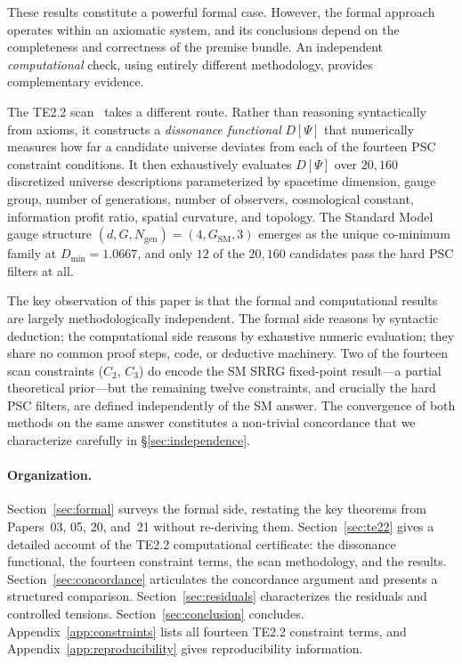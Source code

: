 \documentclass[11pt,twocolumn]{article}
\theoremstyle{remark}
\begin{document}
These results constitute a powerful formal case.
However, the formal approach operates within an axiomatic system, and
its conclusions depend on the completeness and correctness of the
premise bundle.
An independent \emph{computational} check, using entirely different
methodology, provides complementary evidence.

The TE2.2 scan~\cite{SpivackPSCConcordance} takes a different route.
Rather than reasoning syntactically from axioms, it constructs a
\emph{dissonance functional} $D[\Psi]$ that numerically measures
how far a candidate universe deviates from each of the fourteen PSC
constraint conditions.
It then exhaustively evaluates $D[\Psi]$ over $20{,}160$ discretized
universe descriptions parameterized by spacetime dimension, gauge
group, number of generations, number of observers, cosmological
constant, information profit ratio, spatial curvature, and topology.
The Standard Model gauge structure $(d,G,N_{\mathrm{gen}})=(4,G_{\mathrm{SM}},3)$
emerges as the unique co-minimum family at $D_{\min}=1.0667$,
and only $12$ of the $20{,}160$ candidates pass the hard PSC filters at
all.

The key observation of this paper is that the formal and computational
results are largely methodologically independent.
The formal side reasons by syntactic deduction; the computational side
reasons by exhaustive numeric evaluation; they share no common proof
steps, code, or deductive machinery.
Two of the fourteen scan constraints ($C_2$, $C_3$) do encode the SM
SRRG fixed-point result---a partial theoretical prior---but the
remaining twelve constraints, and crucially the hard PSC filters, are
defined independently of the SM answer.
The convergence of both methods on the same answer constitutes a
non-trivial concordance that we characterize carefully in
§\ref{sec:independence}.

\paragraph{Organization.}
Section~\ref{sec:formal} surveys the formal side, restating the key
theorems from Papers~03, 05, 20, and~21 without re-deriving them.
Section~\ref{sec:te22} gives a detailed account of the TE2.2 computational
certificate: the dissonance functional, the fourteen constraint terms,
the scan methodology, and the results.
Section~\ref{sec:concordance} articulates the concordance argument and
presents a structured comparison.
Section~\ref{sec:residuals} characterizes the residuals and controlled
tensions.
Section~\ref{sec:conclusion} concludes.
Appendix~\ref{app:constraints} lists all fourteen TE2.2 constraint terms,
and Appendix~\ref{app:reproducibility} gives reproducibility information.
\end{document}
